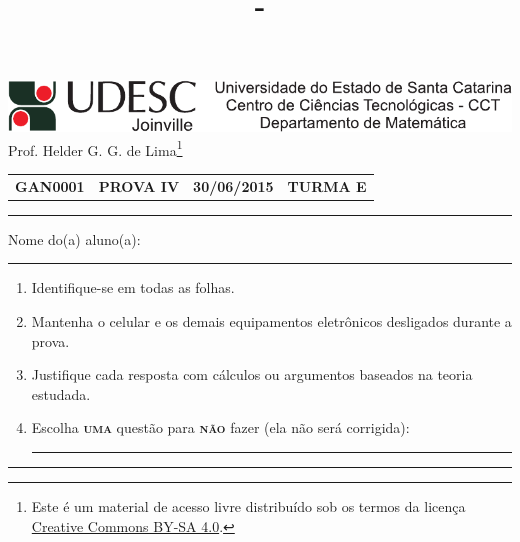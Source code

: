 \documentclass[12pt,a4paper]{article}
\author{\eu}
\title{\tipo - \disciplina}
\date{\data}
\newcommand*\tipo{PROVA IV}
\newcommand*\turma{TURMA E}
\newcommand*\disciplina{GAN0001}
\newcommand*\eu{Helder G. G. de Lima}
\newcommand*\data{30/06/2015}
\begin{document}
\thispagestyle{empty}
\begin{center}
\includegraphics{udesc_joinville_cabecalho.pdf}
\\ Prof. \eu\footnote{
Este é um material de acesso livre distribuído sob os termos da licença \href{https://creativecommons.org/licenses/by-sa/4.0/deed.pt_BR}{Creative Commons BY-SA 4.0}.}

\noindent\begin{tabular}{l c c r}
  \textbf{\disciplina}
& \textbf{\tipo}
& \textbf{\data}
& \textbf{\turma}
\end{tabular}\vspace{-0.3cm}
\noindent\rule{17cm}{0.01cm}
\end{center}

\noindent Nome do(a) aluno(a): \rule{13cm}{0.01cm}

{\footnotesize
\begin{enumerate}
\renewcommand{\theenumi}{\Roman{enumi}}
\item Identifique-se em todas as folhas.
\item Mantenha o celular e os demais equipamentos eletrônicos desligados durante a prova.
\item Justifique cada resposta com cálculos ou argumentos baseados na teoria estudada.
\item Escolha \textsc{\textbf{uma}} questão para \textsc{\textbf{não}} fazer (ela não será corrigida): \rule{3cm}{0.01cm}
\end{enumerate}
}

\noindent\rule{17cm}{0.01cm}
\end{document}

